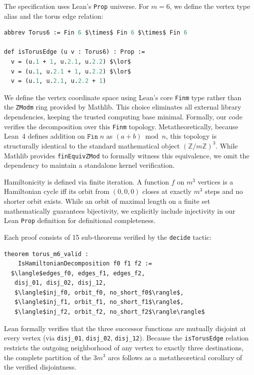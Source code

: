 \documentclass[11pt]{article}
\theoremstyle{plain}
\begin{document}
The specification uses Lean's \texttt{Prop} universe. For $m=6$, we
define the vertex type alias and the torus edge relation:
\begin{lstlisting}[language=ML,mathescape=true]
abbrev Torus6 := Fin 6 $\times$ Fin 6 $\times$ Fin 6

def isTorusEdge (u v : Torus6) : Prop :=
  v = (u.1 + 1, u.2.1, u.2.2) $\lor$
  v = (u.1, u.2.1 + 1, u.2.2) $\lor$
  v = (u.1, u.2.1, u.2.2 + 1)
\end{lstlisting}
We define the vertex coordinate space using Lean's core
\texttt{Fin\;m} type rather than the \texttt{ZMod\;m} ring provided by
Mathlib. This choice eliminates all external library dependencies,
keeping the trusted computing base minimal. Formally, our code verifies
the decomposition over this \texttt{Fin\;m} topology.
Metatheoretically, because Lean~4 defines addition on $\texttt{Fin}\;n$
as $(a + b) \bmod n$, this topology is structurally identical to the
standard mathematical object $(\mathbb{Z}/m\mathbb{Z})^3$. While
Mathlib provides \texttt{finEquivZMod} to formally witness this
equivalence, we omit the dependency to maintain a standalone kernel
verification.

Hamiltonicity is defined via finite iteration. A function $f$ on $m^3$
vertices is a Hamiltonian cycle iff its orbit from $(0,0,0)$ closes at
exactly $m^3$ steps and no shorter orbit exists. While an orbit of
maximal length on a finite set mathematically guarantees bijectivity,
we explicitly include injectivity in our Lean \texttt{Prop} definition
for definitional completeness.

Each proof consists of 15 sub-theorems verified by the \texttt{decide}
tactic:
\begin{lstlisting}[language=ML,mathescape=true]
theorem torus_m6_valid :
    IsHamiltonianDecomposition f0 f1 f2 :=
  $\langle$edges_f0, edges_f1, edges_f2,
   disj_01, disj_02, disj_12,
   $\langle$inj_f0, orbit_f0, no_short_f0$\rangle$,
   $\langle$inj_f1, orbit_f1, no_short_f1$\rangle$,
   $\langle$inj_f2, orbit_f2, no_short_f2$\rangle\rangle$
\end{lstlisting}

Lean formally verifies that the three successor functions are
mutually disjoint at every vertex (via \texttt{disj\_01},
\texttt{disj\_02}, \texttt{disj\_12}). Because the
\texttt{isTorusEdge} relation restricts the outgoing neighborhood
of any vertex to exactly three destinations, the complete partition
of the $3m^3$ arcs follows as a metatheoretical corollary of the
verified disjointness.
\end{document}
